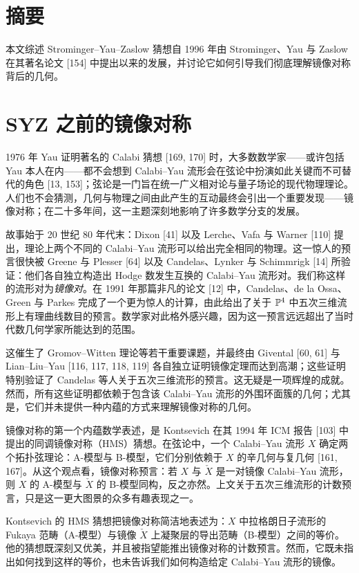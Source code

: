 \section*{摘要}
本文综述 Strominger--Yau--Zaslow 猜想自 1996 年由 Strominger、Yau 与 Zaslow 在其著名论文 [154] 中提出以来的发展，并讨论它如何引导我们彻底理解镜像对称背后的几何。

\section{SYZ 之前的镜像对称}
1976 年 Yau 证明著名的 Calabi 猜想 [169, 170] 时，大多数数学家------或许包括 Yau 本人在内------都不会想到 Calabi--Yau 流形会在弦论中扮演如此关键而不可替代的角色 [13, 153]；弦论是一门旨在统一广义相对论与量子场论的现代物理理论。人们也不会猜测，几何与物理之间由此产生的互动最终会引出一个重要发现------镜像对称；在二十多年间，这一主题深刻地影响了许多数学分支的发展。

故事始于 20 世纪 80 年代末：Dixon [41] 以及 Lerche、Vafa 与 Warner [110] 提出，理论上两个不同的 Calabi--Yau 流形可以给出完全相同的物理。这一惊人的预言很快被 Greene 与 Plesser [64] 以及 Candelas、Lynker 与 Schimmrigk [14] 所验证：他们各自独立构造出 Hodge 数发生互换的 Calabi--Yau 流形对。我们称这样的流形对为\emph{镜像对}。在 1991 年那篇非凡的论文 [12] 中，Candelas、de la Ossa、Green 与 Parkes 完成了一个更为惊人的计算，由此给出了关于 $\mathbb{P}^4$ 中五次三维流形上有理曲线数目的预言。数学家对此格外感兴趣，因为这一预言远远超出了当时代数几何学家所能达到的范围。

这催生了 Gromov--Witten 理论等若干重要课题，并最终由 Givental [60, 61] 与 Lian--Liu--Yau [116, 117, 118, 119] 各自独立证明镜像定理而达到高潮；这些证明特别验证了 Candelas 等人关于五次三维流形的预言。这无疑是一项辉煌的成就。然而，所有这些证明都依赖于包含该 Calabi--Yau 流形的外围环面簇的几何；尤其是，它们并未提供一种内蕴的方式来理解镜像对称的几何。

镜像对称的第一个内蕴数学表述，是 Kontsevich 在其 1994 年 ICM 报告 [103] 中提出的同调镜像对称（HMS）猜想。在弦论中，一个 Calabi--Yau 流形 $X$ 确定两个拓扑弦理论：A-模型与 B-模型，它们分别依赖于 $X$ 的辛几何与复几何 [161, 167]。从这个观点看，镜像对称预言：若 $X$ 与 $\check X$ 是一对镜像 Calabi--Yau 流形，则 $X$ 的 A-模型与 $\check X$ 的 B-模型同构，反之亦然。上文关于五次三维流形的计数预言，只是这一更大图景的众多有趣表现之一。

Kontsevich 的 HMS 猜想把镜像对称简洁地表述为：$X$ 中拉格朗日子流形的 Fukaya 范畴（A-模型）与镜像 $\check X$ 上凝聚层的导出范畴（B-模型）之间的等价。他的猜想既深刻又优美，并且被指望能推出镜像对称的计数预言。然而，它既未指出如何找到这样的等价，也未告诉我们如何构造给定 Calabi--Yau 流形的镜像。


